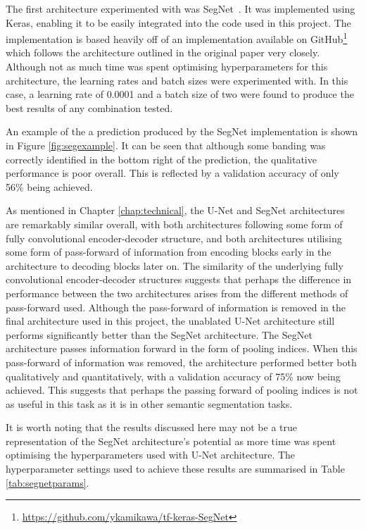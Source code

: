 The first architecture experimented with was SegNet~\cite{segnet}. It was implemented using Keras, enabling it to be easily integrated into the code used in this project. The implementation is based heavily off of an implementation available on GitHub\footnote{\url{https://github.com/ykamikawa/tf-keras-SegNet}} which follows the architecture outlined in the original paper very closely. Although not as much time was spent optimising hyperparameters for this architecture, the learning rates and batch sizes were experimented with. In this case, a learning rate of 0.0001 and a batch size of two were found to produce the best results of any combination tested.

An example of the a prediction produced by the SegNet implementation is shown in Figure \ref{fig:segexample}. It can be seen that although some banding was correctly identified in the bottom right of the prediction, the qualitative performance is poor overall. This is reflected by a validation accuracy of only 56\% being achieved.

As mentioned in Chapter \ref{chap:technical}, the U-Net and SegNet architectures are remarkably similar overall, with both architectures following some form of fully convolutional encoder-decoder structure, and both architectures utilising some form of pass-forward of information from encoding blocks early in the architecture to decoding blocks later on. The similarity of the underlying fully convolutional encoder-decoder structures suggests that perhaps the difference in performance between the two architectures arises from the different methods of pass-forward used. Although the pass-forward of information is removed in the final architecture used in this project, the unablated U-Net architecture still performs significantly better than the SegNet architecture. The SegNet architecture passes information forward in the form of pooling indices. When this pass-forward of information was removed, the architecture performed better both qualitatively and quantitatively, with a validation accuracy of 75\% now being achieved. This suggests that perhaps the passing forward of pooling indices is not as useful in this task as it is in other semantic segmentation tasks.

It is worth noting that the results discussed here may not be a true representation of the SegNet architecture's potential as more time was spent optimising the hyperparameters used with U-Net architecture. The hyperparameter settings used to achieve these results are summarised in Table \ref{tab:segnetparams}.

